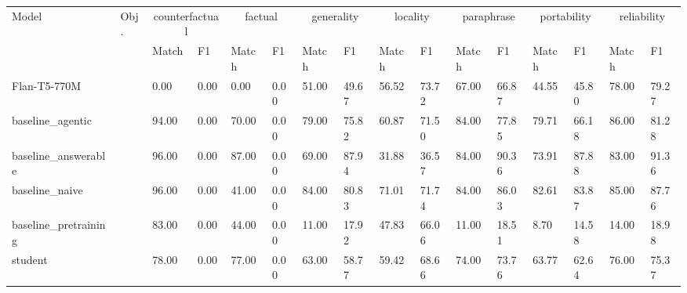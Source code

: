 \begin{tabular}{llllllllllllllll}
\toprule
Model & Obj. & \multicolumn{2}{c}{counterfactual} & \multicolumn{2}{c}{factual} & \multicolumn{2}{c}{generality} & \multicolumn{2}{c}{locality} & \multicolumn{2}{c}{paraphrase} & \multicolumn{2}{c}{portability} & \multicolumn{2}{c}{reliability} \\
 &  & Match & F1 & Match & F1 & Match & F1 & Match & F1 & Match & F1 & Match & F1 & Match & F1 \\
\midrule
Flan-T5-770M &  & 0.00 & 0.00 & 0.00 & 0.00 & 51.00 & 49.67 & 56.52 & 73.72 & 67.00 & 66.87 & 44.55 & 45.80 & 78.00 & 79.27 \\
baseline_agentic &  & 94.00 & 0.00 & 70.00 & 0.00 & 79.00 & 75.82 & 60.87 & 71.50 & 84.00 & 77.85 & 79.71 & 66.18 & 86.00 & 81.28 \\
baseline_answerable &  & 96.00 & 0.00 & 87.00 & 0.00 & 69.00 & 87.94 & 31.88 & 36.57 & 84.00 & 90.36 & 73.91 & 87.88 & 83.00 & 91.36 \\
baseline_naive &  & 96.00 & 0.00 & 41.00 & 0.00 & 84.00 & 80.83 & 71.01 & 71.74 & 84.00 & 86.03 & 82.61 & 83.87 & 85.00 & 87.76 \\
baseline_pretraining &  & 83.00 & 0.00 & 44.00 & 0.00 & 11.00 & 17.92 & 47.83 & 66.06 & 11.00 & 18.51 & 8.70 & 14.58 & 14.00 & 18.98 \\
student &  & 78.00 & 0.00 & 77.00 & 0.00 & 63.00 & 58.77 & 59.42 & 68.66 & 74.00 & 73.76 & 63.77 & 62.64 & 76.00 & 75.37 \\
\bottomrule
\end{tabular}
